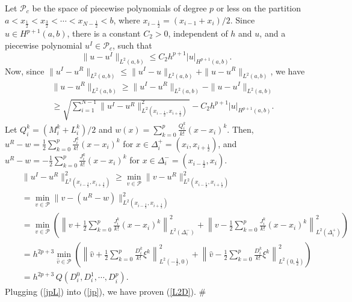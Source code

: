 \documentclass{article}
\numberwithin{equation}{section}
\begin{document}
\begin{spacing}{1.15}
 Let ${\mathcal P}_c$ be the space of piecewise
polynomials of degree $p$ or less on the partition
$a<x_{\frac{1}{2}}<x_{\frac{3}{2}}<\cdots<x_{N-\frac{1}{2}}<b$,
where $x_{i-\frac{1}{2}} = (x_{i-1}+x_i)/2$. Since $u \in
H^{p+1}(a,b)$, there is a constant $C_2 > 0$, independent of $h$ and
$u$, and a piecewise polynomial $u^I \in {\mathcal P}_c$, such that
\begin{equation} \label{uI}
\|u-u^I\|_{L^2 (a,b)} \le C_2 h^{p+1} |u|_{H^{p+1}(a,b)}.
\end{equation}
Now, since $\|u^I-u^R\|_{L^2 (a,b)} \le \|u^I-u\|_{L^2 (a,b)} + \|u-u^R\|_{L^2 (a,b)}$, we have
\begin{eqnarray}
&& \|u-u^R\|_{L^2 (a,b)} \ge \|u^I-u^R\|_{L^2 (a,b)} - \|u-u^I\|_{L^2 (a,b)} \nonumber \\
&& \ge \sqrt{ \sum_{i=1}^{N-1}  \|u^I-u^R\|^2_{L^2
(x_{i-\frac{1}{2}},x_{i+\frac{1}{2}})} } - C_2 h^{p+1}
|u|_{H^{p+1}(a,b)}. \label{jp}
\end{eqnarray}
Let $Q^k_i = (M^k_i + L^k_i)/2$ and $w(x) = \sum_{k=0}^p
\frac{Q^k_i}{k!} (x-x_i)^k$. Then, $u^R-w = \frac{1}{2} \sum_{k=0}^p
\frac{J^k_i}{k!} (x-x_i)^k$ for $x \in \Delta_i^+ =
(x_i,x_{i+\frac{1}{2}})$, and $u^R-w = - \frac{1}{2} \sum_{k=0}^p
\frac{J^k_i}{k!} (x-x_i)^k$ for $x \in \Delta_i^- =
(x_{i-\frac{1}{2}},x_i)$.
\begin{eqnarray}
&& \|u^I-u^R\|^2_{L^2 (x_{i-\frac{1}{2}},x_{i+\frac{1}{2}})} \ge \min_{v \in {\mathcal P}}  \|v-u^R\|^2_{L^2 (x_{i-\frac{1}{2}},x_{i+\frac{1}{2}})} \nonumber \\
&& =  \min_{v \in {\mathcal P}}  \|v-(u^R-w)\|^2_{L^2 (x_{i-\frac{1}{2}},x_{i+\frac{1}{2}})} \nonumber \\
&& =  \min_{v \in {\mathcal P}} \left( \left\|v+\frac{1}{2} \sum_{k=0}^{p}
\frac{J^k_i}{k!}(x-x_i)^k \right\|^2_{L^2(\Delta_i^-)}
                                 + \left\|v-\frac{1}{2} \sum_{k=0}^{p} \frac{J^k_i}{k!}(x-x_i)^k \right\|^2_{L^2 (\Delta_i^+)}  \right) \nonumber \\
&& =  h^{2p+3}  \min_{\hat{v} \in {\mathcal P}} \left(
\left\|\hat{v}+\frac{1}{2} \sum_{k=0}^{p} \frac{D^k_i}{k!}\xi^k
\right\|^2_{L^2 (-\frac{1}{2},0)}
              + \left\|\hat{v}-\frac{1}{2} \sum_{k=0}^{p} \frac{D^k_i}{k!}\xi^k \right\|^2_{L^2 (0,\frac{1}{2})}  \right) \nonumber \\
&& = h^{2p+3} \, Q(D^0_i, D^1_i,\cdots,D^p_i). \label{jpL}
\end{eqnarray}
Plugging (\ref{jpL}) into (\ref{jp}), we have proven (\ref{L2D}). \#


\end{spacing}
\end{document}

